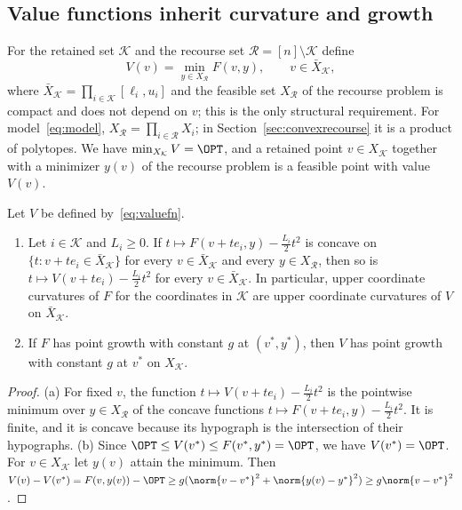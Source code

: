 \subsection{Value functions inherit curvature and growth}\label{sec:valuefn}
For the retained set $\mathcal K$ and the recourse set
$\mathcal R=[n]\setminus\mathcal K$ define
\begin{equation}\label{eq:valuefn}
V(v)=\min_{y\in X_{\mathcal R}}F(v,y),\qquad v\in\bar X_{\mathcal K},
\end{equation}
where $\bar X_{\mathcal K}=\prod_{i\in\mathcal K}[\ell_i,u_i]$ and the
feasible set $X_{\mathcal R}$ of the recourse problem is compact and does
not depend on $v$; this is the only structural requirement. For
model~\eqref{eq:model}, $X_{\mathcal R}=\prod_{i\in\mathcal R}X_i$; in
Section~\ref{sec:convexrecourse} it is a product of polytopes. We have
$\min_{X_{\mathcal K}}V=\OPT$, and a retained point $v\in X_{\mathcal K}$
together with a minimizer $y(v)$ of the recourse problem is a feasible point
with value $V(v)$.

\begin{lemma}\label{lem:valuefunction}
Let $V$ be defined by~\eqref{eq:valuefn}.
\begin{enumerate}[label=(\alph*)]
\item Let $i\in\mathcal K$ and $L_i\ge0$. If
$t\mapsto F(v+te_i,y)-\frac{L_i}{2}t^2$ is concave on
$\{t:v+te_i\in\bar X_{\mathcal K}\}$ for every $v\in\bar X_{\mathcal K}$
and every $y\in X_{\mathcal R}$, then so is
$t\mapsto V(v+te_i)-\frac{L_i}{2}t^2$ for every $v\in\bar X_{\mathcal K}$.
In particular, upper coordinate curvatures of $F$ for the coordinates in
$\mathcal K$ are upper coordinate curvatures of $V$ on $\bar X_{\mathcal K}$.
\item If $F$ has point growth with constant $g$ at $(v^*,y^*)$, then $V$
has point growth with constant $g$ at $v^*$ on $X_{\mathcal K}$.
\end{enumerate}
\end{lemma}

\begin{proof}
(a) For fixed $v$, the function $t\mapsto V(v+te_i)-\frac{L_i}{2}t^2$ is the
pointwise minimum over $y\in X_{\mathcal R}$ of the concave functions
$t\mapsto F(v+te_i,y)-\frac{L_i}{2}t^2$. It is finite, and it is concave
because its hypograph is the intersection of their hypographs.
(b) Since $\OPT\le V(v^*)\le F(v^*,y^*)=\OPT$, we have $V(v^*)=\OPT$. For
$v\in X_{\mathcal K}$ let $y(v)$ attain the minimum. Then
$V(v)-V(v^*)=F(v,y(v))-\OPT\ge g(\norm{v-v^*}^2+\norm{y(v)-y^*}^2)\ge
g\norm{v-v^*}^2$.
\end{proof}

